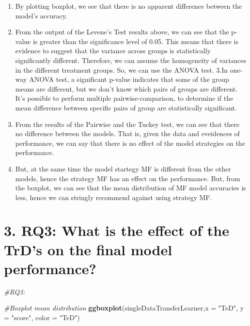 \documentclass[]{article}
\newenvironment{Shaded}{\begin{snugshade}}{\end{snugshade}}
\newcommand{\KeywordTok}[1]{\textcolor[rgb]{0.13,0.29,0.53}{\textbf{#1}}}
\newcommand{\DataTypeTok}[1]{\textcolor[rgb]{0.13,0.29,0.53}{#1}}
\newcommand{\StringTok}[1]{\textcolor[rgb]{0.31,0.60,0.02}{#1}}
\newcommand{\CommentTok}[1]{\textcolor[rgb]{0.56,0.35,0.01}{\textit{#1}}}
\newcommand{\NormalTok}[1]{#1}
\providecommand{\tightlist}{%
  \setlength{\itemsep}{0pt}\setlength{\parskip}{0pt}}
\begin{document}
\begin{enumerate}
\def\labelenumi{\arabic{enumi}.}
\tightlist
\item
  By plotting boxplot, we see that there is no apparent difference
  between the model's accuracy.
\item
  From the output of the Levene's Test results above, we can see that
  the p-value is greater than the significance level of 0.05. This means
  that there is evidence to suggest that the variance across groups is
  statistically significantly different. Therefore, we can assume the
  homogeneity of variances in the different treatment groups. So, we can
  use the ANOVA test. 3.In one-way ANOVA test, a significant p-value
  indicates that some of the group means are different, but we don't
  know which pairs of groups are different. It's possible to perform
  multiple pairwise-comparison, to determine if the mean difference
  between specific pairs of group are statistically significant.
\item
  From the results of the Pairwise and the Tuckey test, we can see that
  there no difference between the models. That is, given the data and
  eveidences of performance, we can say that there is no effect of the
  model strategies on the performance.
\item
  But, at the same time the model startegy MF is different from the
  other models, hence the strategy MF has an effect on the performance.
  But, from the boxplot, we can see that the mean distribution of MF
  model accuracies is less, hence we can stringly recommend against
  using strategy MF.
\end{enumerate}

\section{3. RQ3: What is the effect of the TrD's on the final model
performance?}\label{rq3-what-is-the-effect-of-the-trds-on-the-final-model-performance}

\begin{Shaded}
\begin{Highlighting}[]
\CommentTok{#RQ3:}

\CommentTok{#Boxplot mean distribution}
\KeywordTok{ggboxplot}\NormalTok{(singleDataTransferLearner,}\DataTypeTok{x =} \StringTok{"TeD"}\NormalTok{, }\DataTypeTok{y =} \StringTok{"score"}\NormalTok{, }\DataTypeTok{color =} \StringTok{"TeD"}\NormalTok{)}
\end{Highlighting}
\end{Shaded}
\end{document}
